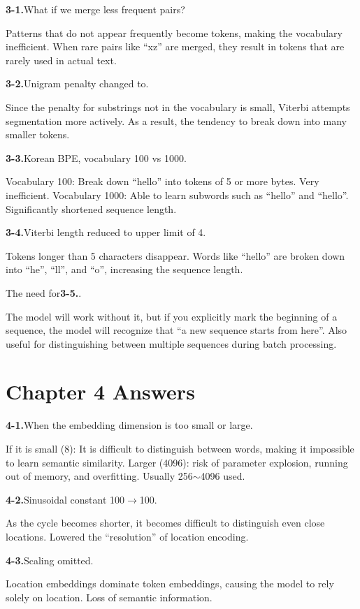 \textbf{3-1.}What if we merge less frequent pairs?

Patterns that do not appear frequently become tokens, making the vocabulary inefficient. When rare pairs like ``xz'' are merged, they result in tokens that are rarely used in actual text.

\textbf{3-2.}Unigram penalty changed to.

Since the penalty for substrings not in the vocabulary is small, Viterbi attempts segmentation more actively. As a result, the tendency to break down into many smaller tokens.

\textbf{3-3.}Korean BPE, vocabulary 100 vs 1000.

Vocabulary 100: Break down ``hello'' into tokens of 5 or more bytes. Very inefficient.
Vocabulary 1000: Able to learn subwords such as ``hello'' and ``hello''. Significantly shortened sequence length.

\textbf{3-4.}Viterbi length reduced to upper limit of 4.

Tokens longer than 5 characters disappear. Words like ``hello'' are broken down into ``he'', ``ll'', and ``o'', increasing the sequence length.

The need for\textbf{3-5.}.

The model will work without it, but if you explicitly mark the beginning of a sequence, the model will recognize that ``a new sequence starts from here''. Also useful for distinguishing between multiple sequences during batch processing.

\section{Chapter 4 Answers}

\textbf{4-1.}When the embedding dimension is too small or large.

If it is small (8): It is difficult to distinguish between words, making it impossible to learn semantic similarity.
Larger (4096): risk of parameter explosion, running out of memory, and overfitting. Usually 256$\sim$4096 used.

\textbf{4-2.}Sinusoidal constant 100$\to$100.

As the cycle becomes shorter, it becomes difficult to distinguish even close locations. Lowered the ``resolution'' of location encoding.

\textbf{4-3.}Scaling omitted.

Location embeddings dominate token embeddings, causing the model to rely solely on location. Loss of semantic information.

